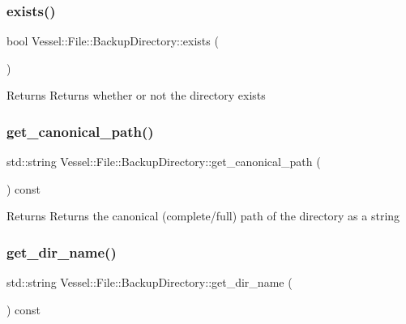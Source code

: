\subsubsection{\texorpdfstring{exists()}{exists()}}
{\footnotesize\ttfamily bool Vessel\+::\+File\+::\+Backup\+Directory\+::exists (\begin{DoxyParamCaption}{ }\end{DoxyParamCaption})}

\begin{DoxyReturn}{Returns}
Returns whether or not the directory exists 
\end{DoxyReturn}
\mbox{\label{class_vessel_1_1_file_1_1_backup_directory_aed6edcfe0cc919b123062c010f41f409}} 
\subsubsection{\texorpdfstring{get\+\_\+canonical\+\_\+path()}{get\_canonical\_path()}}
{\footnotesize\ttfamily std\+::string Vessel\+::\+File\+::\+Backup\+Directory\+::get\+\_\+canonical\+\_\+path (\begin{DoxyParamCaption}{ }\end{DoxyParamCaption}) const}

\begin{DoxyReturn}{Returns}
Returns the canonical (complete/full) path of the directory as a string 
\end{DoxyReturn}
\mbox{\label{class_vessel_1_1_file_1_1_backup_directory_a96fda7ffff230b4f3443bfee0dbfe10d}} 
\subsubsection{\texorpdfstring{get\+\_\+dir\+\_\+name()}{get\_dir\_name()}}
{\footnotesize\ttfamily std\+::string Vessel\+::\+File\+::\+Backup\+Directory\+::get\+\_\+dir\+\_\+name (\begin{DoxyParamCaption}{ }\end{DoxyParamCaption}) const}

